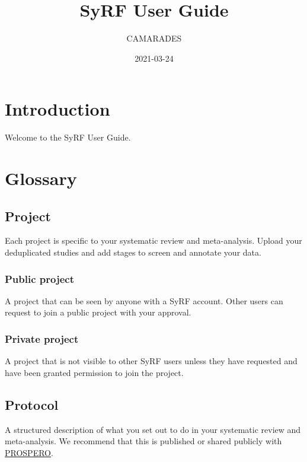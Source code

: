\documentclass[
]{book}
\title{SyRF User Guide}
\author{CAMARADES}
\date{2021-03-24}
\begin{document}
\maketitle

{
\setcounter{tocdepth}{1}
\tableofcontents
}
\hypertarget{index}{%
\chapter{Introduction}\label{index}}

Welcome to the SyRF User Guide.

\hypertarget{glossary}{%
\chapter{Glossary}\label{glossary}}

\hypertarget{project}{%
\section{Project}\label{project}}

Each project is specific to your systematic review and meta-analysis. Upload your deduplicated studies and add stages to screen and annotate your data.

\hypertarget{public-project}{%
\subsection{Public project}\label{public-project}}

A project that can be seen by anyone with a SyRF account. Other users can request to join a public project with your approval.

\hypertarget{private-project}{%
\subsection{Private project}\label{private-project}}

A project that is not visible to other SyRF users unless they have requested and have been granted permission to join the project.

\hypertarget{protocol}{%
\section{Protocol}\label{protocol}}

A structured description of what you set out to do in your systematic review and meta-analysis. We recommend that this is published or shared publicly with \href{https://www.crd.york.ac.uk/prospero/}{PROSPERO}.
\end{document}
